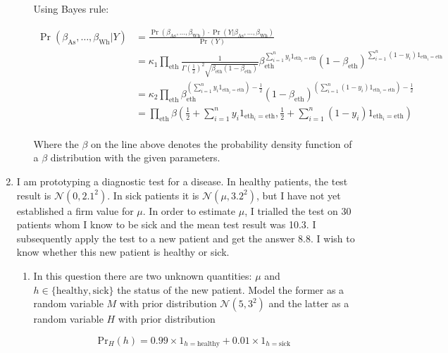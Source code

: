 \documentclass[10pt,\jkfside,a4paper]{article}
\begin{document}
\begin{enumerate}
\begin{enumerate}[label=(\alph*)]
Using Bayes rule:

\[
\begin{split}
\Pr(\beta_{\text{As}}, \dots, \beta_{\text{Wh}}| Y) &=
\frac{\Pr(\beta_{\text{As}}, \dots, \beta_{\text{Wh}})\cdot
\Pr(Y | \beta_{\text{As}}, \dots, \beta_{\text{Wh}})}{\Pr(Y)} \\
&= \kappa_1 \prod_{\text{eth}}\frac{1}{\Gamma\left( \frac{1}{2} \right)^2\sqrt
{\beta_\text{eth}(1 - \beta_\text{eth})
}}\beta_{\text{eth}}^{\sum^{n}_{i=1}y_i 1_{\text{eth}_i=\text{eth}}}
\left( 1 - \beta_{\text{eth}} \right)^{\sum^{n}_{i=1}(1 - y_i)1_{\text{eth}_i=\text{eth}} } \\
&= \kappa_2 \prod_{\text{eth}}\beta_{\text{eth}}^{\left(\sum^{n}_{i=1}y_i
1_{\text{eth}_i=\text{eth}}\right) - \frac{1}{2}}\left( 1 -
\beta_{\text{eth}} \right)^{\left(\sum^{n}_{i=1}(1 - y_i)1_{\text{eth}_i=\text{eth}}\right) - \frac{1}{2}} \\
&= \prod_{\text{eth}}\beta\left(\frac{1}{2} + \sum^{n}_{i=1}y_i
1_{\text{eth}_i=\text{eth}}, \frac{1}{2} + \sum^{n}_{i=1}(1 - y_i)
1_{\text{eth}_i=\text{eth}}\right) \\
\end{split}
\]

Where the $\beta$ on the line above denotes the probability density
function of a $\beta$ distribution with the given parameters.

\end{enumerate}

\item I am prototyping a diagnostic test for a disease. In healthy patients,
the test result is $\mathcal{N}(0, 2.1^2)$. In sick patients it is
$\mathcal{N}(\mu, 3.2^2)$, but I have not yet established a firm value for
$\mu$. In order to estimate $\mu$, I trialled the test on 30 patients whom
I know to be sick and the mean test result was 10.3. I subsequently apply
the test to a new patient and get the answer 8.8. I wish to know whether
this new patient is healthy or sick.

\begin{enumerate}[label=(\alph*)]

\item In this question there are two unknown quantities: $\mu$ and $h \in
\{\text{healthy}, \text{sick}\}$ the status of the new patient. Model the
former as a random variable $M$ with prior distribution $\mathcal{N}(5, 3^2)$
and the latter as a random variable $H$ with prior distribution

\[
\text{Pr}_H(h) = 0.99 \times 1_{h=\text{healthy}} + 0.01\times 1_{h=\text{sick}}
\]


\end{enumerate}
\end{enumerate}
\end{document}
